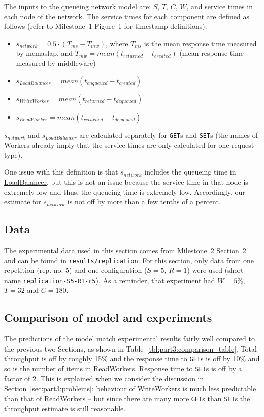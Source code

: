 \documentclass[11pt]{article}
\newcommand{\get}[0]{\texttt{GET}}
\newcommand{\set}[0]{\texttt{SET}}
\newcommand{\linkmain}[1]{\href{https://gitlab.inf.ethz.ch/pungast/asl-fall16-project/blob/master/src/main/java/asl/#1.java}{#1}}
\begin{document}
The inputs to the queueing network model are: $S$, $T$, $C$, $W$, and service times in each node of the network. The service times for each component are defined as follows (refer to Milestone~1 Figure~1 for timestamp definitions):

\begin{itemize}
	\item $s_{network} = 0.5 \cdot (T_{ms} - T_{mw})$, where $T_{ms}$ is the mean response time measured by memaslap, and $T_{mw} = mean(t_{returned}-t_{created})$ (mean response time measured by middleware)
	\item $s_{LoadBalancer} = mean(t_{enqueued}-t_{created})$
	\item $s_{WriteWorker} = mean(t_{returned}-t_{dequeued})$
	\item $s_{ReadWorker} = mean(t_{returned}-t_{dequeued})$
\end{itemize}

$s_{network}$ and $s_{LoadBalancer}$ are calculated separately for \get{}s and \set{}s (the names of Workers already imply that the service times are only calculated for one request type).

One issue with this definition is that $s_{network}$ includes the queueing time in \linkmain{LoadBalancer}, but this is not an issue because the service time in that node is extremely low and thus, the queueing time is extremely low. Accordingly, our estimate for $s_{network}$ is not off by more than a few tenths of a percent.


\subsection{Data}
\label{sec:part3:data}
The experimental data used in this section comes from Milestone~2 Section~2 and can be found in \texttt{\href{https://gitlab.inf.ethz.ch/pungast/asl-fall16-project/tree/master/results/replication}{results/replication}}. For this section, only data from one repetition (rep. no. 5) and one configuration ($S=5$, $R=1$) were used (short name \texttt{replication-S5-R1-r5}). As a reminder, that experiment had $W=5\%$, $T=32$ and $C=180$.

\subsection{Comparison of model and experiments}


The predictions of the model match experimental results fairly well compared to the previous two Sections, as shown in Table~\ref{tbl:part3:comparison_table}. Total throughput is off by roughly 15\% and the response time to \get{}s is off by 10\% and so is the number of items in \linkmain{ReadWorker}s. Response time to \set{}s is off by a factor of 2. This is explained when we consider the discussion in Section~\ref{sec:part3:problems}: behaviour of \linkmain{WriteWorker}s is much less predictable than that of \linkmain{ReadWorker}s -- but since there are many more \get{}s than \set{}s the throughput estimate is still reasonable.
\end{document}
